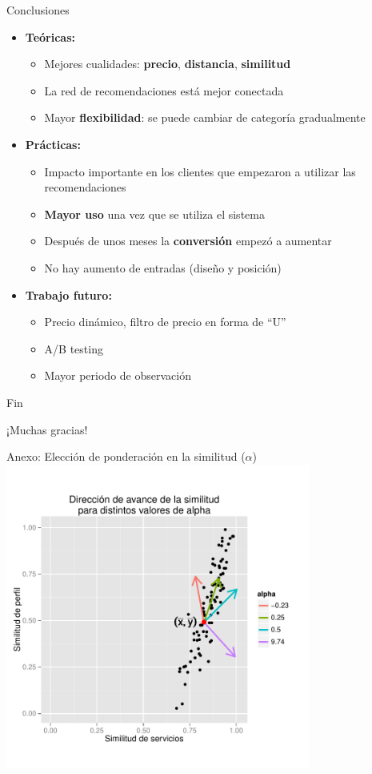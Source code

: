\documentclass{beamer}
\begin{document}
\begin{frame}{Conclusiones}
	\begin{itemize}
		\item \textbf{Teóricas:}
		\begin{itemize}
			\item Mejores cualidades: \textbf{precio}, \textbf{distancia}, \textbf{similitud}
			\item La red de recomendaciones está mejor conectada
			\item Mayor \textbf{flexibilidad}: se puede cambiar de categoría gradualmente
		\end{itemize}
		\item \textbf{Prácticas:}
		\begin{itemize}
			\item Impacto importante en los clientes que empezaron a utilizar las recomendaciones
			\item \textbf{Mayor uso} una vez que se utiliza el sistema
			\item Después de unos meses la \textbf{conversión} empezó a aumentar
			\item No hay aumento de entradas (diseño y posición)
		\end{itemize}
		\item \textbf{Trabajo futuro:}
		\begin{itemize}
			\item Precio dinámico, filtro de precio en forma de ``U''
			\item A/B testing
			\item Mayor periodo de observación
		\end{itemize}
	\end{itemize}
\end{frame}

\begin{frame}{Fin}
\begin{center}
\Huge
¡Muchas gracias!
\end{center}
\end{frame}

\begin{frame}{Anexo: Elección de ponderación en la similitud ($\alpha$)}
	\centering
	\includegraphics[width=0.75\textwidth]{imagenes/alpha.pdf}
\end{frame}
\end{document}
